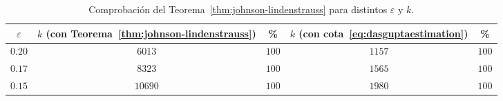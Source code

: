 \begin{table}[ht!]
	\centering
	\caption{Comprobación del Teorema~\ref{thm:johnson-lindenstrauss} para distintos $\varepsilon$ y $k$.}
	\begin{tabular}{ccccc}
		\hline
		$\varepsilon$ & $k$ (con Teorema~\ref{thm:johnson-lindenstrauss}) & \%    & $k$ (con cota~\eqref{eq:dasguptaestimation}) & \%    \\
		\hline
		$0.20$        & $6013$                                            & $100$ & $1157$                                       & $100$ \\
		\hline
		$0.17$        & $8323$                                            & $100$ & $1565$                                       & $100$ \\
		\hline
		$0.15$        & $10690$                                           & $100$ & $1980$                                       & $100$ \\
		\hline
	\end{tabular}
	\label{tab:verification}
\end{table}
